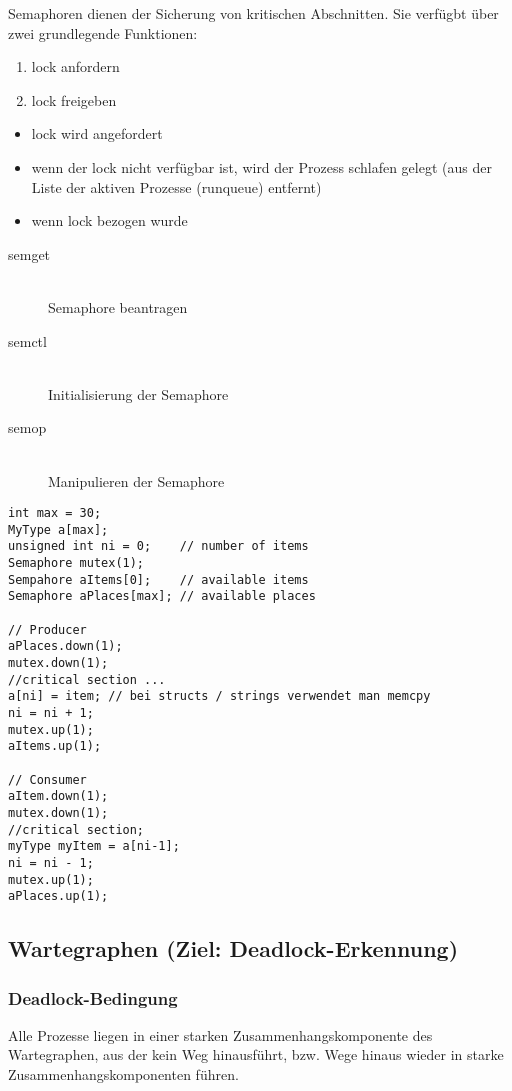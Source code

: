 Semaphoren dienen der Sicherung von kritischen Abschnitten. Sie verfügbt über zwei grundlegende Funktionen:

\begin{enumerate}
\item lock anfordern
\item lock freigeben
\end{enumerate}

\begin{itemize}
\item lock wird angefordert
\item wenn der lock nicht verfügbar ist, wird der Prozess schlafen gelegt (aus der Liste der aktiven Prozesse (runqueue) entfernt)
\item wenn lock bezogen wurde
\end{itemize}

\begin{description}
\item[semget] \hfill \\
	 Semaphore beantragen
\item[semctl] \hfill \\
	 Initialisierung der Semaphore
\item[semop] \hfill \\
	Manipulieren der Semaphore
\end{description}

\begin{lstlisting}
int max = 30;
MyType a[max];
unsigned int ni = 0;	// number of items
Semaphore mutex(1);
Sempahore aItems[0]; 	// available items
Semaphore aPlaces[max];	// available places

// Producer
aPlaces.down(1);
mutex.down(1);
//critical section ...
a[ni] = item; // bei structs / strings verwendet man memcpy
ni = ni + 1;
mutex.up(1);
aItems.up(1);

// Consumer
aItem.down(1);
mutex.down(1);
//critical section;
myType myItem = a[ni-1];
ni = ni - 1;
mutex.up(1);
aPlaces.up(1);
\end{lstlisting}

    
\subsection{Wartegraphen (Ziel: Deadlock-Erkennung)}

\subsubsection{Deadlock-Bedingung}
Alle Prozesse liegen in einer starken Zusammenhangskomponente des Wartegraphen, aus der kein Weg hinausführt, bzw. Wege hinaus wieder in starke Zusammenhangskomponenten führen.

